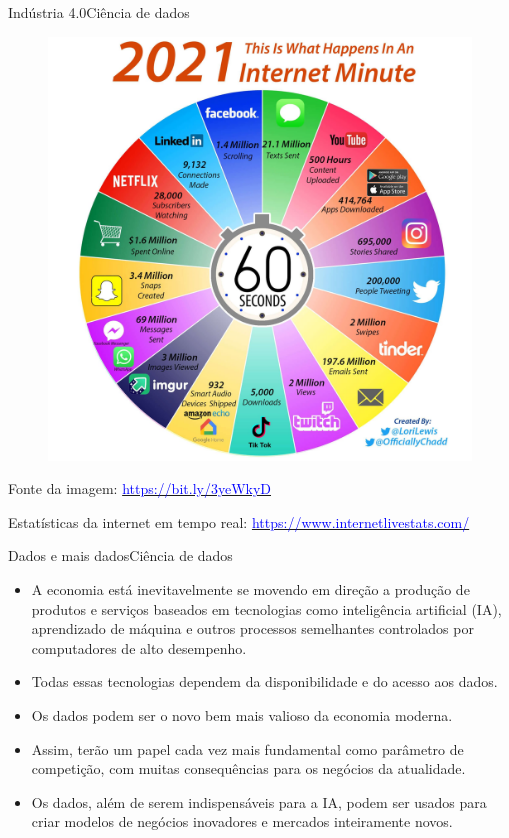 \documentclass[t]{beamer}
\begin{document}
\begin{ftst}{Indústria 4.0}{Ciência de dados}

\begin{figure}
    \centering
    \includegraphics[scale=0.09]{Figuras/slide00_03.jpg}
\end{figure}

\scriptsize
Fonte da imagem: \href{https://bit.ly/3yeWkyD}{\textcolor{blue}{https://bit.ly/3yeWkyD}} 
 
Estatísticas da internet em tempo real: \href{https://www.internetlivestats.com/}{\textcolor{blue}{https://www.internetlivestats.com/}}

\end{ftst}



\begin{ftst}{Dados e mais dados}{Ciência de dados}
\small
\begin{itemize}
    \item A economia está inevitavelmente se movendo em direção a produção de produtos e serviços baseados em tecnologias como inteligência artificial (IA), aprendizado de máquina e outros processos semelhantes controlados por computadores de alto desempenho.
    \item Todas essas tecnologias dependem da disponibilidade e do acesso aos dados.
    \item Os dados podem ser o novo bem mais valioso da economia moderna.
    \item Assim, terão um papel cada vez mais fundamental como parâmetro de competição, com muitas consequências para os negócios da atualidade.
    \item Os dados, além de serem indispensáveis para a IA, podem ser usados para criar modelos de negócios inovadores e mercados inteiramente novos.
\end{itemize}

\end{ftst}
\end{document}
